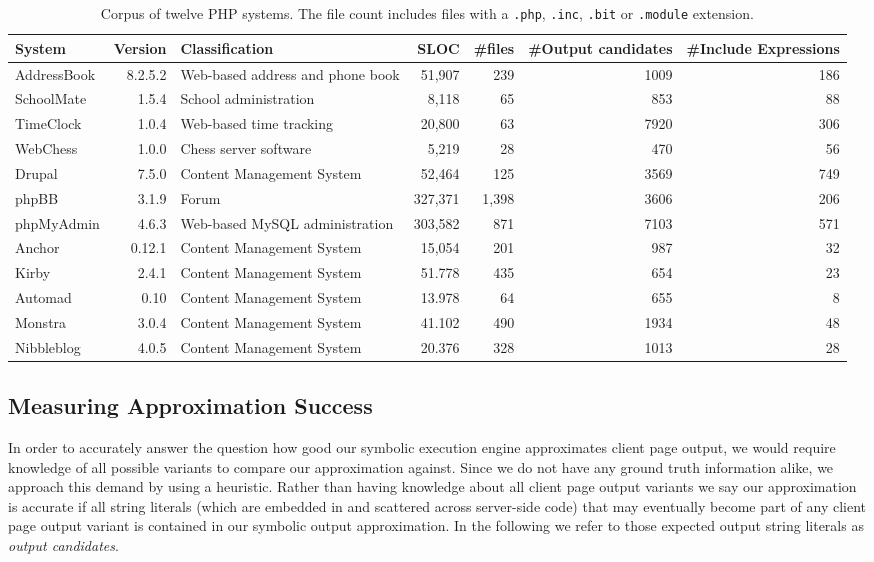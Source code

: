 \documentclass[sigconf]{acmart}
\renewcommand{\tt}[1]{\texttt{#1}}
\begin{document}
\begin{table*}[t]
\centering 
	\begin{tabular}{lrp{5cm}rrrr}
	\toprule
	\textbf{System} & \textbf{Version} & \textbf{Classification} & \textbf{SLOC} &
	\textbf{\#files} & \textbf{\#Output candidates} & \textbf{\#Include
	Expressions}\\
	\midrule
	AddressBook & 8.2.5.2 & Web-based address and phone book & 51,907 & 239  & 1009
	& 186\\
	SchoolMate & 1.5.4 & School administration & 8,118 & 65  & 853 & 88\\
	TimeClock & 1.0.4 & Web-based time tracking & 20,800 & 63  & 7920 & 306\\
	WebChess & 1.0.0 & Chess server software & 5,219 & 28  & 470 & 56\\
	\midrule
	Drupal & 7.5.0 & Content Management System &  52,464 & 125  & 3569 & 749\\
	phpBB & 3.1.9 & Forum & 327,371 & 1,398  & 3606 & 206\\
	phpMyAdmin & 4.6.3 & Web-based MySQL administration & 303,582 & 871  & 7103 &
	571\\
	\midrule
	Anchor & 0.12.1 & Content Management System & 15,054 & 201 & 987 & 32\\
	Kirby & 2.4.1 & Content Management System & 51.778 & 435  & 654 & 23\\
	Automad & 0.10 & Content Management System & 13.978 & 64  & 655 & 8\\
	Monstra & 3.0.4 & Content Management System & 41.102 & 490  & 1934 & 48\\
	Nibbleblog & 4.0.5 & Content Management System & 20.376 & 328  & 1013 & 28\\
	\bottomrule
	\end{tabular}
	\vspace{1mm}
	\caption{Corpus of twelve PHP systems. The file count includes files with a
	\tt{.php}, \tt{.inc}, \tt{.bit} or \tt{.module} extension.}
	\label{corpus}
\end{table*}

\subsection{Measuring Approximation Success} \label{heuristic}
In order to accurately answer the question how good our symbolic execution
engine approximates client page output, we would require knowledge of all
possible variants to compare our approximation against. Since we do not have
any ground truth information alike, we approach this demand by using a
heuristic. Rather than having knowledge about all client page output variants
we say our approximation is accurate if all string literals (which are embedded
in and  scattered across server-side code) that may eventually become part of any
client page output variant is contained in our symbolic output approximation. In
the following we refer to those expected output string literals as \emph{output candidates}.
\end{document}
